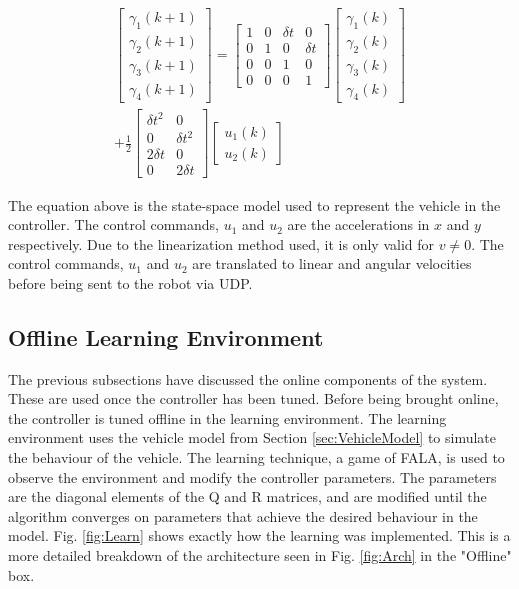 \documentclass[conference]{IEEEtran}
\begin{document}
\begin{multline*}
\begin{bmatrix}
\gamma_{1}(k+1) \\
\gamma_{2}(k+1) \\
\gamma_{3}(k+1) \\
\gamma_{4}(k+1) 
\end{bmatrix}
=
\begin{bmatrix}
1&0&\delta t&0\\
0&1&0&\delta t\\
0&0&1&0\\
0&0&0&1
\end{bmatrix}
\begin{bmatrix}
\gamma_{1}(k) \\
\gamma_{2}(k) \\
\gamma_{3}(k) \\
\gamma_{4}(k) 
\end{bmatrix}\\
+
\frac{1}{2}
\begin{bmatrix}
\delta t^2&0\\
0&\delta t^2\\
2\delta t&0\\
0&2\delta t
\end{bmatrix}
\begin{bmatrix}
u_{1}(k)\\
u_{2}(k)
\end{bmatrix}
\end{multline*}

The equation above is the state-space model used to represent the vehicle in the controller. The control commands, $u_{1}$ and $u_{2}$ are the accelerations in $x$ and $y$ respectively. Due to the linearization method used, it is only valid for $v \neq 0$. The control commands, $u_{1}$ and $u_{2}$ are translated to linear and angular velocities before being sent to the robot via UDP.

\subsection{Offline Learning Environment}
The previous subsections have discussed the online components of the system. These are used once the controller has been tuned. Before being brought online, the controller is tuned offline in the learning environment. The learning environment uses the vehicle model from Section \ref{sec:VehicleModel} to simulate the behaviour of the vehicle. The learning technique, a game of FALA, is used to observe the environment and modify the controller parameters. The parameters are the diagonal elements of the Q and R matrices, and are modified until the algorithm converges on parameters that achieve the desired behaviour in the model. Fig. \ref{fig:Learn} shows exactly how the learning was implemented. This is a more detailed breakdown of the architecture seen in Fig. \ref{fig:Arch} in the "Offline" box.
\end{document}
